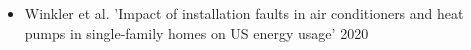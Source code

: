 \begin{itemize}
\item Winkler et al. 'Impact of installation faults in air conditioners and heat pumps in single-family homes on US energy usage' 2020
\end{itemize}
